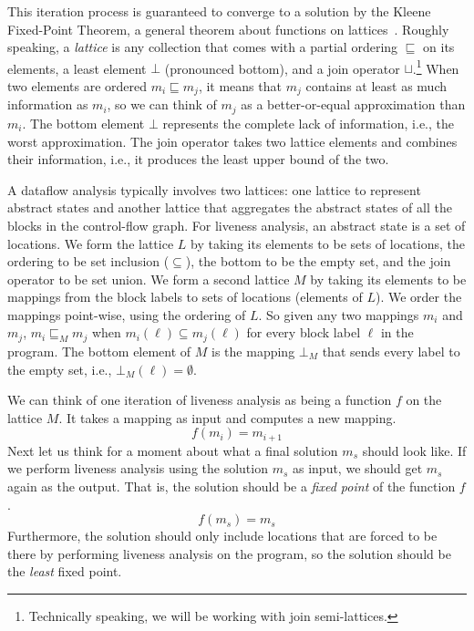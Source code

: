 \documentclass[11pt]{book}
\begin{document}
This iteration process is guaranteed to converge to a solution by the
Kleene Fixed-Point Theorem, a general theorem about functions on
lattices~\citep{Kleene:1952aa}. Roughly speaking, a \emph{lattice} is
any collection that comes with a partial ordering $\sqsubseteq$ on its
elements, a least element $\bot$ (pronounced bottom), and a join
operator $\sqcup$.\footnote{Technically speaking, we will be
  working with join semi-lattices.} When two elements are ordered $m_i
\sqsubseteq m_j$, it means that $m_j$ contains at least as much
information as $m_i$, so we can think of $m_j$ as a better-or-equal
approximation than $m_i$.  The bottom element $\bot$ represents the
complete lack of information, i.e., the worst approximation.  The join
operator takes two lattice elements and combines their information,
i.e., it produces the least upper bound of the two.

A dataflow analysis typically involves two lattices: one lattice to
represent abstract states and another lattice that aggregates the
abstract states of all the blocks in the control-flow graph.  For
liveness analysis, an abstract state is a set of locations.  We form
the lattice $L$ by taking its elements to be sets of locations, the
ordering to be set inclusion ($\subseteq$), the bottom to be the empty
set, and the join operator to be set union.
%
We form a second lattice $M$ by taking its elements to be mappings
from the block labels to sets of locations (elements of $L$).  We
order the mappings point-wise, using the ordering of $L$. So given any
two mappings $m_i$ and $m_j$, $m_i \sqsubseteq_M m_j$ when $m_i(\ell)
\subseteq m_j(\ell)$ for every block label $\ell$ in the program.  The
bottom element of $M$ is the mapping $\bot_M$ that sends every label
to the empty set, i.e., $\bot_M(\ell) = \emptyset$.

We can think of one iteration of liveness analysis as being a function
$f$ on the lattice $M$. It takes a mapping as input and computes a new
mapping.
\[
   f(m_i) = m_{i+1}
\]
Next let us think for a moment about what a final solution $m_s$
should look like. If we perform liveness analysis using the solution
$m_s$ as input, we should get $m_s$ again as the output. That is, the
solution should be a \emph{fixed point} of the function $f$.
\[
   f(m_s) = m_s
\]
Furthermore, the solution should only include locations that are
forced to be there by performing liveness analysis on the program, so
the solution should be the \emph{least} fixed point.
\end{document}
